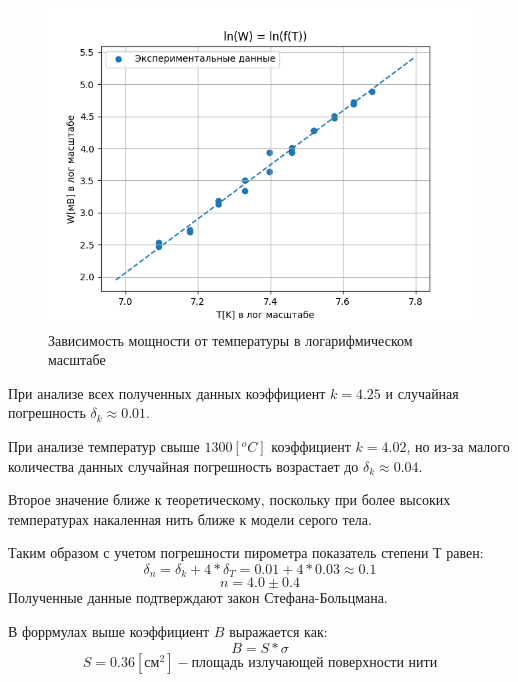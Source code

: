 \documentclass[a4paper,12pt]{article} %
\begin{document}
			\begin{figure}[h]
				\centering
				\includegraphics[width=15cm]{img/Graph1.PNG}
				\caption{Зависимость мощности от температуры в логарифмическом масштабе}
				\label{graph1}
			\end{figure}
			При анализе всех полученных данных коэффициент $k = 4.25$ и случайная погрешность $\delta_k \approx 0.01$.\par
			При анализе температур свыше $1300 [^oC]$ коэффициент $k = 4.02$, но из-за малого количества данных случайная погрешность возрастает до $\delta_k \approx 0.04$.\par
			Второе значение ближе к теоретическому, поскольку при более высоких температурах накаленная нить ближе к модели серого тела.\par
			Таким образом с учетом погрешности пирометра показатель степени Т равен:
			\begin{equation}
				\delta_n = \delta_k + 4 * \delta_T = 0.01 + 4 * 0.03 \approx 0.1
			\end{equation}
			\begin{equation}
				n = 4.0 \pm 0.4				
			\end{equation}
			Полученные данные подтверждают закон Стефана-Больцмана.\par
	\newpage
			В форрмулах выше коэффициент $B$ выражается как:
			\begin{equation}
				B = S * \sigma
			\end{equation} 
			\begin{equation}
				S = 0.36 [\text{см}^2] - \text{площадь излучающей поверхности нити}
			\end{equation}
\end{document}
